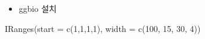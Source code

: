 \documentclass[
]{book}
\newenvironment{Shaded}{\begin{snugshade}}{\end{snugshade}}
\newcommand{\AttributeTok}[1]{\textcolor[rgb]{0.77,0.63,0.00}{#1}}
\newcommand{\DecValTok}[1]{\textcolor[rgb]{0.00,0.00,0.81}{#1}}
\newcommand{\FunctionTok}[1]{\textcolor[rgb]{0.00,0.00,0.00}{#1}}
\newcommand{\NormalTok}[1]{#1}
\providecommand{\tightlist}{%
  \setlength{\itemsep}{0pt}\setlength{\parskip}{0pt}}
\begin{document}
\begin{itemize}
\tightlist
\item
  ggbio 설치
\end{itemize}

\begin{Shaded}
\begin{Highlighting}[]

\FunctionTok{IRanges}\NormalTok{(}\AttributeTok{start =} \FunctionTok{c}\NormalTok{(}\DecValTok{1}\NormalTok{,}\DecValTok{1}\NormalTok{,}\DecValTok{1}\NormalTok{,}\DecValTok{1}\NormalTok{), }\AttributeTok{width =} \FunctionTok{c}\NormalTok{(}\DecValTok{100}\NormalTok{, }\DecValTok{15}\NormalTok{, }\DecValTok{30}\NormalTok{, }\DecValTok{4}\NormalTok{))}
\end{Highlighting}
\end{Shaded}
\end{document}
